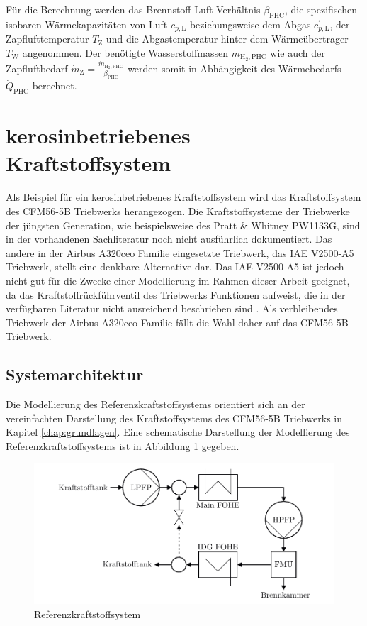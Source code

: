 Für die Berechnung werden das Brennstoff-Luft-Verhältnis $\beta_\mathrm{PHC}$, die spezifischen isobaren Wärmekapazitäten von Luft $c_{p,\mathrm{L}}$ beziehungsweise dem Abgas $c_{p,\mathrm{L}}^{'}$, der Zapflufttemperatur $T_\mathrm{Z}$ und die Abgastemperatur hinter dem Wärmeübertrager $T_\mathrm{W}$ angenommen. Der benötigte Wasserstoffmassen $\dot{m}_{\mathrm{H}_2, \mathrm{PHC}}$ wie auch der Zapfluftbedarf $\dot{m}_\mathrm{Z} = \frac{\dot{m}_{\mathrm{H}_2, \mathrm{PHC}}}{\beta_\mathrm{PHC}}$ werden somit in Abhängigkeit des Wärmebedarfs $\dot{Q}_\mathrm{PHC}$ berechnet.

\section{kerosinbetriebenes Kraftstoffsystem}

Als Beispiel für ein kerosinbetriebenes Kraftstoffsystem wird das Kraftstoffsystem des CFM56-5B Triebwerks herangezogen. Die Kraftstoffsysteme der Triebwerke der jüngsten Generation, wie beispielsweise des Pratt \& Whitney PW1133G, sind in der vorhandenen Sachliteratur noch nicht ausführlich dokumentiert. Das andere in der Airbus A320ceo Familie eingesetzte Triebwerk, das IAE V2500-A5 Triebwerk, stellt eine denkbare Alternative dar. Das IAE V2500-A5 ist jedoch nicht gut für die Zwecke einer Modellierung im Rahmen dieser Arbeit geeignet, da das Kraftstoffrückführventil des  Triebwerks Funktionen aufweist, die in der verfügbaren Literatur nicht ausreichend beschrieben sind \cite{LinkeDiesinger.2014}. Als verbleibendes Triebwerk der Airbus A320ceo Familie fällt die Wahl daher auf das CFM56-5B Triebwerk. 

\subsection{Systemarchitektur}

Die Modellierung des Referenzkraftstoffsystems orientiert sich an der vereinfachten Darstellung des Kraftstoffsystems des CFM56-5B Triebwerks in Kapitel \ref{chap:grundlagen}. Eine schematische Darstellung der Modellierung des Referenzkraftstoffsystems ist in Abbildung \ref{fig:Referenz} gegeben.

\begin{figure}[ht]
\centering
\includegraphics[width=1\linewidth]{4_Abbildungen/2_Hauptteil/Kraftstoffsystem Abbildungen/Referenz.pdf}
  \caption{Referenzkraftstoffsystem}
  \label{fig:Referenz}
\end{figure}
\FloatBarrier 

